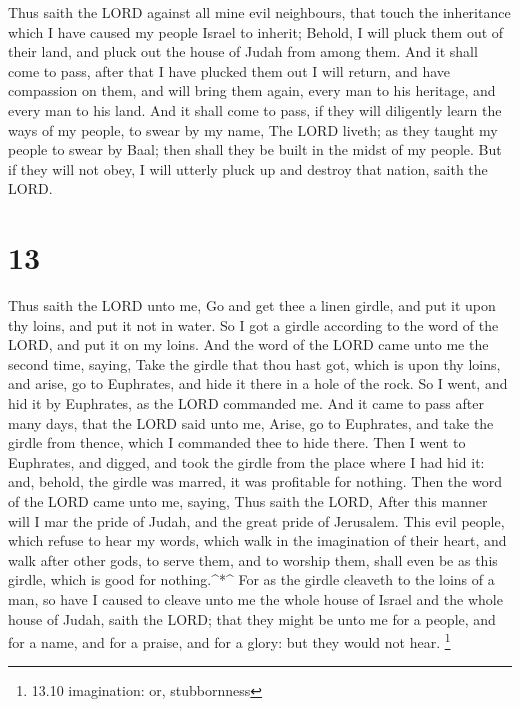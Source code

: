  Thus saith the LORD against all mine evil neighbours, that
touch the inheritance which I have caused my people Israel to inherit;
Behold, I will pluck them out of their land, and pluck out the house of
Judah from among them.  And it shall come to pass, after
that I have plucked them out I will return, and have compassion on them,
and will bring them again, every man to his heritage, and every man to
his land.  And it shall come to pass, if they will
diligently learn the ways of my people, to swear by my name, The LORD
liveth; as they taught my people to swear by Baal; then shall they be
built in the midst of my people.  But if they will not
obey, I will utterly pluck up and destroy that nation, saith the LORD.

\hypertarget{section-12}{%
\section{13}\label{section-12}}

 Thus saith the LORD unto me, Go and get thee a linen
girdle, and put it upon thy loins, and put it not in water. 
So I got a girdle according to the word of the LORD, and put it on my
loins.  And the word of the LORD came unto me the second
time, saying,  Take the girdle that thou hast got, which is
upon thy loins, and arise, go to Euphrates, and hide it there in a hole
of the rock.  So I went, and hid it by Euphrates, as the
LORD commanded me.  And it came to pass after many days,
that the LORD said unto me, Arise, go to Euphrates, and take the girdle
from thence, which I commanded thee to hide there.  Then I
went to Euphrates, and digged, and took the girdle from the place where
I had hid it: and, behold, the girdle was marred, it was profitable for
nothing.  Then the word of the LORD came unto me, saying,
 Thus saith the LORD, After this manner will I mar the pride
of Judah, and the great pride of Jerusalem.  This evil
people, which refuse to hear my words, which walk in the imagination of
their heart, and walk after other gods, to serve them, and to worship
them, shall even be as this girdle, which is good for nothing.\^{}*\^{}
 For as the girdle cleaveth to the loins of a man, so have
I caused to cleave unto me the whole house of Israel and the whole house
of Judah, saith the LORD; that they might be unto me for a people, and
for a name, and for a praise, and for a glory: but they would not hear.
\footnote{13.10 imagination: or, stubbornness}

